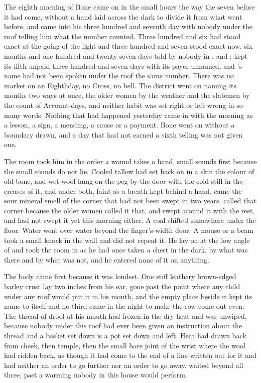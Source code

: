 
The eighth morning of Bone came on in the small hours the way the seven before it had come, without a hand laid across the dark to divide it from what went before, and  came into his three hundred and seventh day with nobody under the roof telling him what the number counted. Three hundred and six had stood exact at the going of the light and three hundred and seven stood exact now, six months and one hundred and twenty-seven days told by nobody in ,  and ;  kept its fifth unpaid three hundred and seven days with its payer unnamed, and 's name had not been spoken under the roof the same number. There was no market on an Eighthday, no Cross, no bell. The district went on naming its months two ways at once, the older women by the weather and the slatemen by the count of Account-days, and neither habit was set right or left wrong in so many words. Nothing that had happened yesterday came in with the morning as a lesson, a sign, a mending, a cause or a payment. Bone went on without a boundary drawn, and a day that had not earned a sixth telling was not given one.

The room took him in the order a wound takes a hand, small sounds first because the small sounds do not lie. Cooled tallow had set back on  in a skin the colour of old bone, and wet wool hung on the peg by the door with the cold still in the creases of it, and under both, faint as a breath kept behind a hand, came the sour mineral smell of the corner that had not been swept in two years.  called that corner  because the older women called it that, and swept around it with the rest, and had not swept it yet this morning either. A coal shifted somewhere under the floor. Water went over water beyond the finger's-width door. A mouse or a beam took a small knock in the wall and did not repeat it. He lay on  at the low angle of  and took the room in as he had once taken a chest in the dark, by what was there and by what was not, and he entered none of it on anything.

The body came first because it was loudest. One stiff leathery brown-edged barley crust lay two inches from his ear, gone past the point where any child under any roof would put it in his mouth, and the empty place beside it kept its name to itself and no third came in the night to make the row come out even. The thread of drool at his mouth had frozen in the dry heat and was unwiped, because nobody under this roof had ever been given an instruction about the thread and a basket set down is a pot set down and left. Heat had drawn back from cheek, then temple, then the small bare joint of the wrist where the wool had ridden back, as though it had come to the end of a line written out for it and had neither an order to go further nor an order to go away.  waited beyond all three, past a warming nobody in this house would perform.

